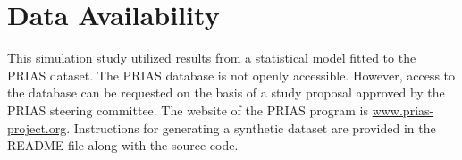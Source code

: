 \section*{Data Availability}
This simulation study utilized results from a statistical model fitted to the PRIAS dataset. The PRIAS database is not openly accessible. However, access to the database can be requested on the basis of a study proposal approved by the PRIAS steering committee. The website of the PRIAS program is \url{www.prias-project.org}. Instructions for generating a synthetic dataset are provided in the README file along with the source code.